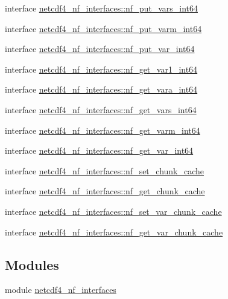 \begin{DoxyCompactItemize}
\item 
interface \hyperlink{interfacenetcdf4__nf__interfaces_1_1nf__put__vars__int64}{netcdf4\+\_\+nf\+\_\+interfaces\+::nf\+\_\+put\+\_\+vars\+\_\+int64}
\item 
interface \hyperlink{interfacenetcdf4__nf__interfaces_1_1nf__put__varm__int64}{netcdf4\+\_\+nf\+\_\+interfaces\+::nf\+\_\+put\+\_\+varm\+\_\+int64}
\item 
interface \hyperlink{interfacenetcdf4__nf__interfaces_1_1nf__put__var__int64}{netcdf4\+\_\+nf\+\_\+interfaces\+::nf\+\_\+put\+\_\+var\+\_\+int64}
\item 
interface \hyperlink{interfacenetcdf4__nf__interfaces_1_1nf__get__var1__int64}{netcdf4\+\_\+nf\+\_\+interfaces\+::nf\+\_\+get\+\_\+var1\+\_\+int64}
\item 
interface \hyperlink{interfacenetcdf4__nf__interfaces_1_1nf__get__vara__int64}{netcdf4\+\_\+nf\+\_\+interfaces\+::nf\+\_\+get\+\_\+vara\+\_\+int64}
\item 
interface \hyperlink{interfacenetcdf4__nf__interfaces_1_1nf__get__vars__int64}{netcdf4\+\_\+nf\+\_\+interfaces\+::nf\+\_\+get\+\_\+vars\+\_\+int64}
\item 
interface \hyperlink{interfacenetcdf4__nf__interfaces_1_1nf__get__varm__int64}{netcdf4\+\_\+nf\+\_\+interfaces\+::nf\+\_\+get\+\_\+varm\+\_\+int64}
\item 
interface \hyperlink{interfacenetcdf4__nf__interfaces_1_1nf__get__var__int64}{netcdf4\+\_\+nf\+\_\+interfaces\+::nf\+\_\+get\+\_\+var\+\_\+int64}
\item 
interface \hyperlink{interfacenetcdf4__nf__interfaces_1_1nf__set__chunk__cache}{netcdf4\+\_\+nf\+\_\+interfaces\+::nf\+\_\+set\+\_\+chunk\+\_\+cache}
\item 
interface \hyperlink{interfacenetcdf4__nf__interfaces_1_1nf__get__chunk__cache}{netcdf4\+\_\+nf\+\_\+interfaces\+::nf\+\_\+get\+\_\+chunk\+\_\+cache}
\item 
interface \hyperlink{interfacenetcdf4__nf__interfaces_1_1nf__set__var__chunk__cache}{netcdf4\+\_\+nf\+\_\+interfaces\+::nf\+\_\+set\+\_\+var\+\_\+chunk\+\_\+cache}
\item 
interface \hyperlink{interfacenetcdf4__nf__interfaces_1_1nf__get__var__chunk__cache}{netcdf4\+\_\+nf\+\_\+interfaces\+::nf\+\_\+get\+\_\+var\+\_\+chunk\+\_\+cache}
\end{DoxyCompactItemize}
\subsection*{Modules}
\begin{DoxyCompactItemize}
\item 
module \hyperlink{namespacenetcdf4__nf__interfaces}{netcdf4\+\_\+nf\+\_\+interfaces}
\end{DoxyCompactItemize}
